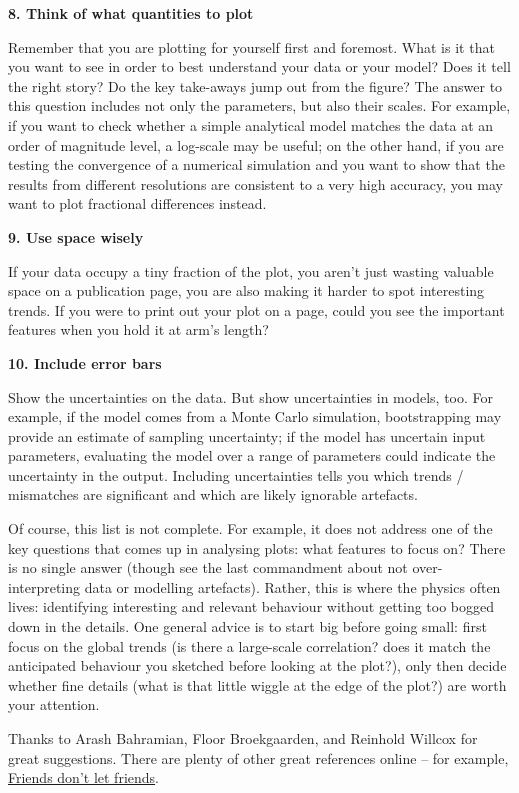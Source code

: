 \documentclass[onecolumn]{aastex7}
\newcommand{\Header}[1]{{\large{\bf{#1}}}}
\begin{document}
\Header{8. Think of what quantities to plot}

Remember that you are plotting for yourself first and foremost.  What is it that you want to see in order to best understand your data or your model?  Does it tell the right story?  Do the key take-aways jump out from the figure?  The answer to this question includes not only the parameters, but also their scales.  For example, if you want to check whether a simple analytical model matches the data at an order of magnitude level, a log-scale may be useful; on the other hand, if you are testing the convergence of a numerical simulation and you want to show that the results from different resolutions are consistent to a very high accuracy, you may want to plot fractional differences instead.

\Header{9. Use space wisely}

If your data occupy a tiny fraction of the plot, you aren't just wasting valuable space on a publication page, you are also making it harder to spot interesting trends.  If you were to print out your plot on a page, could you see the important features when you hold it at arm's length?

\Header{10. Include error bars}

Show the uncertainties on the data.  But show uncertainties in models, too.  For example, if the model comes from a Monte Carlo simulation, bootstrapping may provide an estimate of sampling uncertainty; if the model has uncertain input parameters, evaluating the model over a range of parameters could indicate the uncertainty in the output.  Including uncertainties tells you which trends / mismatches are significant and which are likely ignorable artefacts.

\vspace{0.3in}

Of course, this list is not complete.  For example, it does not address one of the key questions that comes up in analysing plots: what features to focus on?  There is no single answer (though see the last commandment about not over-interpreting data or modelling artefacts).  Rather, this is where the physics often lives: identifying interesting and relevant behaviour without getting too bogged down in the details.  One general advice is to start big before going small: first focus on the global trends (is there a large-scale correlation? does it match the anticipated behaviour you sketched before looking at the plot?), only then decide whether fine details (what is that little wiggle at the edge of the plot?) are worth your attention.

\vspace{0.1in} 

Thanks to Arash Bahramian, Floor Broekgaarden, and Reinhold Willcox for great suggestions.  There are plenty of other great references online -- for example, \href{https://github.com/cxli233/FriendsDontLetFriends}{Friends don't let friends}.
\end{document}
